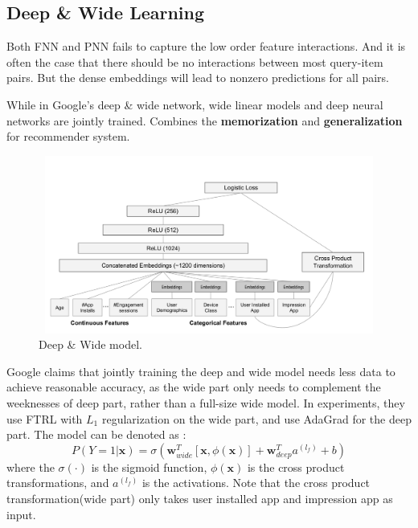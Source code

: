 \documentclass{article}
\begin{document}
\subsection{Deep \& Wide Learning}
Both FNN and PNN fails to capture the low order feature interactions. And it is often the case that there should be no interactions between most query-item pairs. But the dense embeddings will lead to nonzero predictions for all pairs.

While in Google's deep \& wide network\cite{DBLP:conf/recsys/Cheng0HSCAACCIA16}, wide linear models and deep neural networks are jointly trained. Combines the \textbf{memorization} and \textbf{generalization} for recommender system.

\begin{figure}[H]
\centering
\includegraphics[width=4.5in,height=2.3in]{deepandwide}
\caption{Deep \& Wide model.}
\end{figure}
Google claims that jointly training the deep and wide model needs less data to achieve reasonable accuracy, as the wide part only needs to complement the weeknesses of deep part, rather than a full-size wide model.
In experiments, they use FTRL with $L_{1}$ regularization on the wide part, and use AdaGrad for the deep part. The model can be denoted as :
$$P(Y=1|\textbf{x})=\sigma(\textbf{w}_{wide}^{T}[\textbf{x},\phi(\textbf{x})]
+ \textbf{w}_{deep}^{T}a^{(l_{f})} +b
)$$
where the $\sigma(\cdot)$ is the sigmoid function, $\phi(\textbf{x})$ is the cross product transformations, and $a^{(l_{f})}$ is the activations. Note that the cross product transformation(wide part) only takes user installed app and impression app as input.
\end{document}
